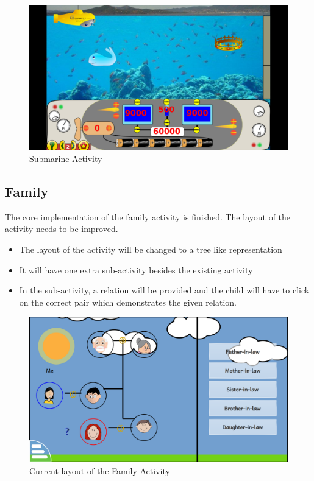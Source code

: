 \documentclass[preprint,12pt]{elsarticle}
\begin{document}
\begin{itemize}
\begin{figure}[h]
\centering\includegraphics[width=1.0\linewidth]{submarine}
\caption{Submarine Activity}
\end{figure}

\end{itemize}

\subsection{Family}

The core implementation of the family activity is finished. The layout of the activity needs to be improved.

\begin{itemize}


\item The layout of the activity will be changed to a tree like representation
\item It will have one extra sub-activity besides the existing activity
\item In the sub-activity, a relation will be provided and the child will have to click on the correct pair which demonstrates the given relation.

\end{itemize}

\begin{figure}[H]
\centering\includegraphics[width=1.0\linewidth]{family}
\caption{Current layout of the Family Activity}
\end{figure}
\end{document}
